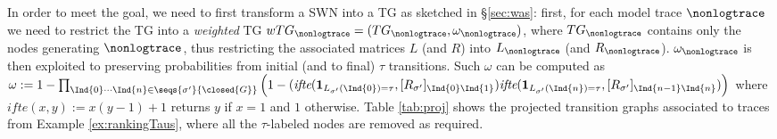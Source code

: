 In order to meet the goal, we need to first transform a SWN into a TG as sketched in \S\ref{sec:was}: first, for each model trace $\nonlogtrace$ we need to restrict the TG into a \textit{weighted} TG $wTG_\nonlogtrace=(TG_{\nonlogtrace},\omega_\nonlogtrace)$, where $TG_{\nonlogtrace}$ contains only the nodes generating $\nonlogtrace$, thus restricting the associated matrices $L$ (and $R$) into $L_\nonlogtrace$ (and $R_\nonlogtrace$). $\omega_\nonlogtrace$ is then exploited to preserving probabilities from initial (and to final) $\tau$ transitions. Such $\omega$ can be computed as $\omega := 1-\prod_{\Ind{0}\cdots\Ind{n}\in\seqs{\sigma'}{ \closed{G}}}\Big(1-(\textit{ifte}(\mathbf{1}_{L_{\sigma'}(\Ind{0})=\tau},[R_{\sigma'}]_{\Ind{0}\Ind{1}})\textit{ifte}(\mathbf{1}_{L_{\sigma'}(\Ind{n})=\tau},[R_{\sigma'}]_{\Ind{n-1}\Ind{n}})\Big)$
where $\textit{ifte}(x,y):=x(y-1)+1$ returns $y$ if $x=1$ and $1$ otherwise. %
Table \ref{tab:proj} shows the projected transition graphs associated to  traces from Example \ref{ex:rankingTaus}, where  all the $\tau$-labeled nodes are removed as required.
%	
%
%
